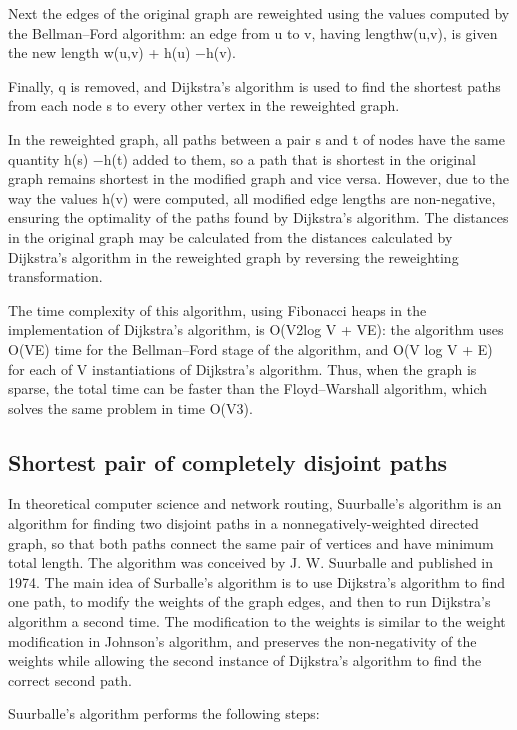 \documentclass[10pt,letterpaper,twocolumn,twosided]{article}
\begin{document}
Next the edges of the original graph are reweighted using the values computed by the Bellman–Ford algorithm: 
an edge from u to v, having lengthw(u,v), is given the new length w(u,v) + h(u) −h(v).

Finally, q is removed, and Dijkstra's algorithm is used to find the shortest paths from each node s to every
other vertex in the reweighted graph.

In the reweighted graph, all paths between a pair s and t of nodes have the same quantity h(s) −h(t) added to
them, so a path that is shortest in the original graph remains shortest in the modified graph and vice versa.
However, due to the way the values h(v) were computed, all modified edge lengths are non-negative, ensuring the
optimality of the paths found by Dijkstra's algorithm. The distances in the original graph may be calculated from 
the distances calculated by Dijkstra's algorithm in the reweighted graph by reversing the reweighting transformation.

The time complexity of this algorithm, using Fibonacci heaps in the implementation of Dijkstra's algorithm, 
is O(V2log V + VE): the algorithm uses O(VE) time for the Bellman–Ford stage of the algorithm, and O(V log V + E)
for each of V instantiations of Dijkstra's algorithm. Thus, when the graph is sparse, the total time can be faster
than the Floyd–Warshall algorithm, which solves the same problem in time O(V3).


\subsection{Shortest pair of completely disjoint paths}

In theoretical computer science and network routing, Suurballe's algorithm is an algorithm for finding two
disjoint paths in a nonnegatively-weighted directed graph, so that both paths connect the same pair of vertices
and have minimum total length. The algorithm was conceived by J. W. Suurballe and published in 1974. The main idea
of Surballe's algorithm is to use Dijkstra's algorithm to find one path, to modify the weights of the graph edges,
and then to run Dijkstra's algorithm a second time. The modification to the weights is similar to the weight 
modification in Johnson's algorithm, and preserves the non-negativity of the weights while allowing the second
instance of Dijkstra's algorithm to find the correct second path.

Suurballe's algorithm performs the following steps:
\end{document}
